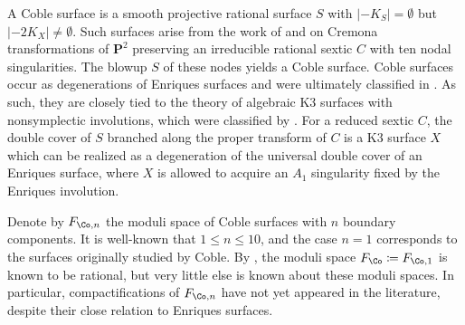 \documentclass{amsart}
\begin{document}
\begin{remark}

A Coble surface is a smooth projective rational surface \(S\) with \({\left\lvert {-K_S} \right\rvert} = \emptyset\) but \({\left\lvert {-2K_X} \right\rvert}\neq \emptyset\). Such surfaces arise from the work of \cite{Cob19} and \cite{Cob29} on Cremona transformations of \({\mathbf{P}}^2\) preserving an irreducible rational sextic \(C\) with ten nodal singularities. The blowup \(S\) of these nodes yields a Coble surface. Coble surfaces occur as degenerations of Enriques surfaces and were ultimately classified in \cite{DZ99}. As such, they are closely tied to the theory of algebraic K3 surfaces with nonsymplectic involutions, which were classified by \cite{nikulin1979quotient-groups}. For a reduced sextic \(C\), the double cover of \(S\) branched along the proper transform of \(C\) is a K3 surface \(X\) which can be realized as a degeneration of the universal double cover of an Enriques surface, where \(X\) is allowed to acquire an \(A_1\) singularity fixed by the Enriques involution.

Denote by \(F_{\Co, n}\) the moduli space of Coble surfaces with \(n\) boundary components. It is well-known that \(1\leq n\leq 10\), and the case \(n=1\) corresponds to the surfaces originally studied by Coble. By \cite{DK13}, the moduli space \(F_{\Co} \coloneqq F_{\Co, 1}\) is known to be rational, but very little else is known about these moduli spaces. In particular, compactifications of \(F_{\Co, n}\) have not yet appeared in the literature, despite their close relation to Enriques surfaces.

\end{remark}
\end{document}
